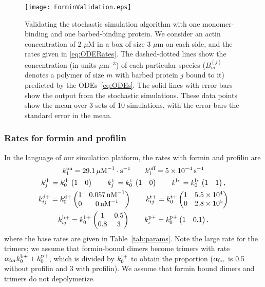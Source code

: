 \documentclass[11pt]{article}
\renewcommand{\j}[1]{{#1}^{(j)}}
\begin{document}
\begin{appendices}
\begin{figure}
\centering
\texttt{[image: ForminValidation.eps]}
\caption{\label{fig:ForminValid}Validating the stochastic simulation algorithm with one monomer-binding and one barbed-binding protein. We consider an actin concentration of 2 $\mu$M in a box of size 3 $\mu$m on each side, and the rates given in \eqref{eq:ODERates}. The dashed-dotted lines show the concentration (in units $\mu$m$^{-3}$) of each particular species ($\j B_m$ denotes a polymer of size $m$ with barbed protein $j$ bound to it) predicted by the ODEs\ \eqref{eq:ODEs}. The solid lines with error bars show the output from the stochastic simulations. These data points show the mean over 3 sets of 10 simulations, with the error bars the standard error in the mean.   }
\end{figure}

\subsubsection{Rates for formin and profilin \label{sec:ForRateDet}}
In the language of our simulation platform, the rates with formin and profilin are
\begin{gather*}
k^\text{on}_1 = 29.1 \, \mu \textrm{M}^{-1} \cdot\text{s}^{-1}\qquad k^\text{off}_1 = 5 \times 10^{-4} \, \text{s}^{-1}  \\ \nonumber
k^\text{d-}_j = k^\text{d-}_0 \begin{pmatrix} 1 & 0 \end{pmatrix} \qquad 
k^\text{t-}_j = k^\text{t-}_0 \begin{pmatrix} 1 & 0 \end{pmatrix}\qquad 
k^\text{b-} = k^\text{b-}_0 \begin{pmatrix} 1 & 1 \end{pmatrix},\\
\nonumber
k^\text{d+}_{ij} = k^\text{d+}_0 \begin{pmatrix} 1 & 0.057 \, \textrm{nM}^{-1} \\ 0 & 0  \, \textrm{nM}^{-1} \end{pmatrix} \qquad 
k^\text{t+}_{ij} =k^\text{t+}_0 \begin{pmatrix} 1 & 5.5 \times 10^4 \\ 0 & 2.8 \times 10^5 \end{pmatrix} \\
k^\text{b+}_{ij} =k^\text{b+}_0 \begin{pmatrix} 1 & 0.5 \\ 0.8 & 3 \end{pmatrix} 
\qquad 
k^\text{p+}_{i} =k^\text{p+}_0 \begin{pmatrix} 1 & 0.1 \\ \end{pmatrix}.
\end{gather*}
where the base rates are given in Table\ \ref{tab:params}. Note the large rate for the trimers; we assume that formin-bound dimers become trimers with rate $\alpha_\text{for} k^\text{b+}_0+k^\text{p+}_0$, which is divided by $k^\text{t+}_0$ to obtain the proportion ($\alpha_\text{for}$ is 0.5 without profilin and 3 with profilin). We assume that formin bound dimers and trimers do not depolymerize.


\end{appendices}
\end{document}
